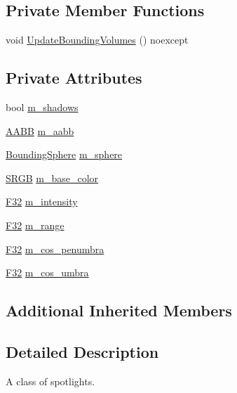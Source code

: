\subsection*{Private Member Functions}
\begin{DoxyCompactItemize}
\item 
void \hyperlink{classmage_1_1_spot_light_a83035abee0050acdca47b1f95b30a793}{Update\+Bounding\+Volumes} () noexcept
\end{DoxyCompactItemize}
\subsection*{Private Attributes}
\begin{DoxyCompactItemize}
\item 
bool \hyperlink{classmage_1_1_spot_light_aa744a471d0f1b39eb5ee435611bb42fe}{m\+\_\+shadows}
\item 
\hyperlink{classmage_1_1_a_a_b_b}{A\+A\+BB} \hyperlink{classmage_1_1_spot_light_ae0e1342ef7e3ca044bb1f16c4c3327a1}{m\+\_\+aabb}
\item 
\hyperlink{classmage_1_1_bounding_sphere}{Bounding\+Sphere} \hyperlink{classmage_1_1_spot_light_a81f061d09f67832c73c3cb1f092679b6}{m\+\_\+sphere}
\item 
\hyperlink{structmage_1_1_s_r_g_b}{S\+R\+GB} \hyperlink{classmage_1_1_spot_light_af61462cf792ad5c713af8d849fa17309}{m\+\_\+base\+\_\+color}
\item 
\hyperlink{namespacemage_aa97e833b45f06d60a0a9c4fc22ae02c0}{F32} \hyperlink{classmage_1_1_spot_light_a79110b6604c73210ba13725be7b66606}{m\+\_\+intensity}
\item 
\hyperlink{namespacemage_aa97e833b45f06d60a0a9c4fc22ae02c0}{F32} \hyperlink{classmage_1_1_spot_light_a53922fe395997f12003cd2dbc2f3ca7a}{m\+\_\+range}
\item 
\hyperlink{namespacemage_aa97e833b45f06d60a0a9c4fc22ae02c0}{F32} \hyperlink{classmage_1_1_spot_light_ac4448bbc1c8a924141d2798c3365047a}{m\+\_\+cos\+\_\+penumbra}
\item 
\hyperlink{namespacemage_aa97e833b45f06d60a0a9c4fc22ae02c0}{F32} \hyperlink{classmage_1_1_spot_light_aa2ec430d0f95d082112260b5d9640d50}{m\+\_\+cos\+\_\+umbra}
\end{DoxyCompactItemize}
\subsection*{Additional Inherited Members}


\subsection{Detailed Description}
A class of spotlights. 

